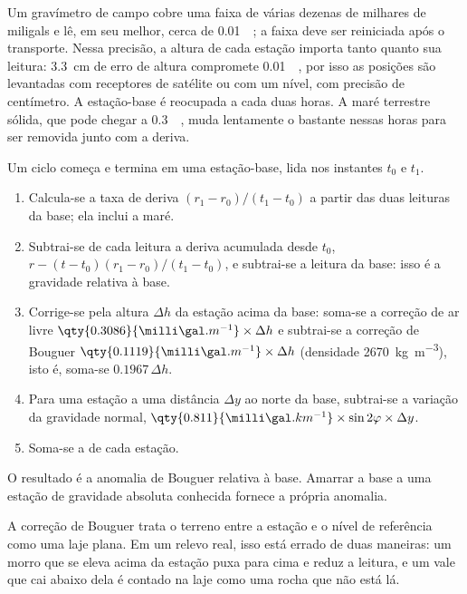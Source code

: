 Um gravímetro de campo cobre uma faixa de várias dezenas de milhares de
miligals e lê, em seu melhor, cerca de \qty{0.01}{\milli\gal}; a faixa deve ser
reiniciada após o transporte. Nessa precisão, a altura de cada estação importa
tanto quanto sua leitura: \qty{3.3}{cm} de erro de altura compromete
\qty{0.01}{\milli\gal}, por isso as posições são levantadas com receptores de
satélite ou com um nível, com precisão de centímetro. A estação-base é
reocupada a cada duas horas. A maré terrestre sólida, que pode chegar a
\qty{0.3}{\milli\gal}, muda lentamente o bastante nessas horas para ser
removida junto com a deriva.

\begin{method}\label{met:b3:field-lab-methods-3:loop}
Um ciclo começa e termina em uma estação-base, lida nos instantes $t_0$ e $t_1$.
\begin{enumerate}
  \item Calcula-se a taxa de deriva $(r_1 - r_0)/(t_1 - t_0)$ a partir das duas
        leituras da base; ela inclui a maré.
  \item Subtrai-se de cada leitura a deriva acumulada desde $t_0$,
        $r - (t - t_0)(r_1 - r_0)/(t_1 - t_0)$, e subtrai-se a leitura da base:
        isso é a gravidade relativa à base.
  \item Corrige-se pela altura $\Delta h$ da estação acima da base:
        soma-se a correção de ar livre $\qty{0.3086}{\milli\gal.m^{-1}}
        \times\Delta h$ e subtrai-se a correção de Bouguer
        $\qty{0.1119}{\milli\gal.m^{-1}}\times\Delta h$ (densidade
        \qty{2670}{kg.m^{-3}}), isto é, soma-se $0.1967\,\Delta h$.
  \item Para uma estação a uma distância $\Delta y$ ao norte da base, subtrai-se
        a variação da gravidade normal, $\qty{0.811}{\milli\gal.km^{-1}}
        \times\sin 2\varphi\times\Delta y$.
  \item Soma-se a  de cada estação.
\end{enumerate}
O resultado é a anomalia de Bouguer relativa à base. Amarrar a base a uma
estação de gravidade absoluta conhecida fornece a própria anomalia.
\end{method}

A correção de Bouguer trata o terreno entre a estação e o nível de referência
como uma laje plana. Em um relevo real, isso está errado de duas maneiras:
um morro que se eleva acima da estação puxa para cima e reduz a leitura, e
um vale que cai abaixo dela é contado na laje como uma rocha que
não está lá.

